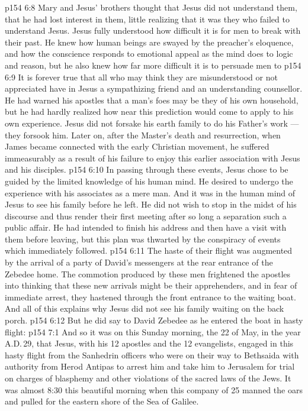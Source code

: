 \vs p154 6:8 \pc Mary and Jesus’ brothers thought that Jesus did not understand them, that he had lost interest in them, little realizing that it was they who failed to understand Jesus. Jesus fully understood how difficult it is for men to break with their past. He knew how human beings are swayed by the preacher’s eloquence, and how the conscience responds to emotional appeal as the mind does to logic and reason, but he also knew how far more difficult it is to persuade men to 
\vs p154 6:9 It is forever true that all who may think they are misunderstood or not appreciated have in Jesus a sympathizing friend and an understanding counsellor. He had warned his apostles that a man’s foes may be they of his own household, but he had hardly realized how near this prediction would come to apply to his own experience. Jesus did not forsake his earth family to do his Father’s work --- they forsook him. Later on, after the Master’s death and resurrection, when James became connected with the early Christian movement, he suffered immeasurably as a result of his failure to enjoy this earlier association with Jesus and his disciples.
\vs p154 6:10 \pc In passing through these events, Jesus chose to be guided by the limited knowledge of his human mind. He desired to undergo the experience with his associates as a mere man. And it was in the human mind of Jesus to see his family before he left. He did not wish to stop in the midst of his discourse and thus render their first meeting after so long a separation such a public affair. He had intended to finish his address and then have a visit with them before leaving, but this plan was thwarted by the conspiracy of events which immediately followed.
\vs p154 6:11 The haste of their flight was augmented by the arrival of a party of David’s messengers at the rear entrance of the Zebedee home. The commotion produced by these men frightened the apostles into thinking that these new arrivals might be their apprehenders, and in fear of immediate arrest, they hastened through the front entrance to the waiting boat. And all of this explains why Jesus did not see his family waiting on the back porch.
\vs p154 6:12 But he did say to David Zebedee as he entered the boat in hasty flight: 
\vs p154 7:1 And so it was on this Sunday morning, the 22 of May, in the year A.D.\,29, that Jesus, with his 12 apostles and the 12 evangelists, engaged in this hasty flight from the Sanhedrin officers who were on their way to Bethsaida with authority from Herod Antipas to arrest him and take him to Jerusalem for trial on charges of blasphemy and other violations of the sacred laws of the Jews. It was almost 8:30 this beautiful morning when this company of 25 manned the oars and pulled for the eastern shore of the Sea of Galilee.
